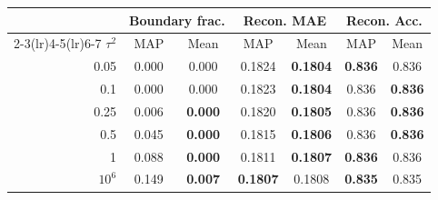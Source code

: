 \begin{tabular}{rcccccc}
\toprule
 & \multicolumn{2}{c}{Boundary frac.} & \multicolumn{2}{c}{Recon. MAE} & \multicolumn{2}{c}{Recon. Acc.} \\
\cmidrule(lr){2-3}\cmidrule(lr){4-5}\cmidrule(lr){6-7}
$\tau^2$ & MAP & Mean & MAP & Mean & MAP & Mean \\
\midrule
0.05 & 0.000 & 0.000 & 0.1824 & \textbf{0.1804} & \textbf{0.836} & 0.836 \\
0.1 & 0.000 & 0.000 & 0.1823 & \textbf{0.1804} & 0.836 & \textbf{0.836} \\
0.25 & 0.006 & \textbf{0.000} & 0.1820 & \textbf{0.1805} & 0.836 & \textbf{0.836} \\
0.5 & 0.045 & \textbf{0.000} & 0.1815 & \textbf{0.1806} & 0.836 & \textbf{0.836} \\
1 & 0.088 & \textbf{0.000} & 0.1811 & \textbf{0.1807} & \textbf{0.836} & 0.836 \\
$10^{6}$ & 0.149 & \textbf{0.007} & \textbf{0.1807} & 0.1808 & \textbf{0.835} & 0.835 \\
\bottomrule
\end{tabular}
